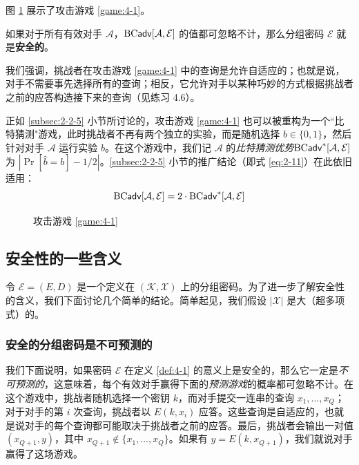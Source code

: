 图 \ref{fig:4-2} 展示了攻击游戏 \ref{game:4-1}。

\begin{definition}[安全的分组密码]\label{def:4-1}
如果对于所有有效对手 $\mathcal{A}$，${\rm BC\mathsf{adv}}[\mathcal{A},\mathcal{E}]$ 的值都可忽略不计，那么分组密码 $\mathcal{E}$ 就是\textbf{安全的}。
\end{definition}

我们强调，挑战者在攻击游戏 \ref{game:4-1} 中的查询是允许自适应的；也就是说，对手不需要事先选择所有的查询；相反，它允许对手以某种巧妙的方式根据挑战者之前的应答构造接下来的查询（见练习 4.6）。

正如 \ref{subsec:2-2-5} 小节所讨论的，攻击游戏 \ref{game:4-1} 也可以被重构为一个``比特猜测"游戏，此时挑战者不再有两个独立的实验，而是随机选择 $b\in\{0,1\}$，然后针对对手 $\mathcal{A}$ 运行实验 $b$。在这个游戏中，我们记 $\mathcal{A}$ 的\emph{比特猜测优势}${\rm BC\mathsf{adv}}^*[\mathcal{A},\mathcal{E}]$ 为 $|\Pr[\hat b = b]-{1}/{2}|$。\ref{subsec:2-2-5} 小节的推广结论（即式 \ref{eq:2-11}）在此依旧适用：
\begin{equation}
{\rm BC\mathsf{adv}}[\mathcal{A},\mathcal{E}]=2\cdot{\rm BC\mathsf{adv}}^*[\mathcal{A},\mathcal{E}]
\end{equation}

\begin{figure}[p!]
  \centering
    
  \caption{攻击游戏 \ref{game:4-1}}
  \label{fig:4-2}
\end{figure}

\subsection{安全性的一些含义}\label{subsec:4-1-1}

令 $\mathcal{E}=(E,D)$ 是一个定义在 $(\mathcal{K},\mathcal{X})$ 上的分组密码。为了进一步了解安全性的含义，我们下面讨论几个简单的结论。简单起见，我们假设 $|\mathcal{X}|$ 是大（超多项式）的。

\subsubsection{安全的分组密码是不可预测的}

我们下面说明，如果密码 $\mathcal{E}$ 在定义 \ref{def:4-1} 的意义上是安全的，那么它一定是\emph{不可预测的}，这意味着，每个有效对手赢得下面的\emph{预测游戏}的概率都可忽略不计。在这个游戏中，挑战者随机选择一个密钥 $k$，而对手提交一连串的查询 $x_1,\dots,x_Q$；对于对手的第 $i$ 次查询，挑战者以 $E(k,x_i)$ 应答。这些查询是自适应的，也就是说对手的每个查询都可能取决于挑战者之前的应答。最后，挑战者会输出一对值 $(x_{Q+1},y)$，其中 $x_{Q+1}\notin\{x_1,\dots,x_Q\}$。如果有 $y=E(k,x_{Q+1})$，我们就说对手赢得了这场游戏。

